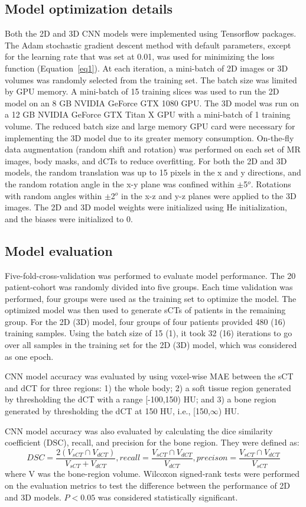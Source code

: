 \subsection{Model optimization details}  
Both the 2D and 3D CNN models were implemented using Tensorflow\cite{RN38} packages. The Adam stochastic gradient descent method\cite{RN39} with default parameters, except for the learning rate that was set at 0.01, was used for minimizing the loss function (Equation~\ref{eq1}). At each iteration, a mini-batch of 2D images or 3D volumes was randomly selected from the training set. The batch size was limited by GPU memory. A mini-batch of 15 training slices was used to run the 2D model on an 8 GB NVIDIA GeForce GTX 1080 GPU. The 3D model was run on a 12 GB NVIDIA GeForce GTX Titan X GPU with a mini-batch of 1 training volume. The reduced batch size and large memory GPU card were necessary for implementing the 3D model due to its greater memory consumption. On-the-fly data augmentation (random shift and rotation) was performed on each set of MR images, body masks, and dCTs to reduce overfitting. For both the 2D and 3D models, the random translation was up to 15 pixels in the x and y directions, and the random rotation angle in the x-y plane was confined within $\pm$5$^{o}$. Rotations with random angles within $\pm$2$^{o}$ in the x-z and y-z planes were applied to the 3D images. The 2D and 3D model weights were initialized using He initialization{\cite{RN40}}, and the biases were initialized to 0. 

\subsection{Model evaluation}  
Five-fold-cross-validation was performed to evaluate model performance. The 20 patient-cohort was randomly divided into five groups. Each time validation was performed, four groups were used as the training set to optimize the model. The optimized model was then used to generate sCTs of patients in the remaining group. For the 2D (3D) model, four groups of four patients provided 480 (16) training samples. Using the batch size of 15 (1), it took 32 (16) iterations to go over all samples in the training set for the 2D (3D) model, which was considered as one epoch. 

CNN model accuracy was evaluated by using voxel-wise MAE between the sCT and dCT for three regions: 1) the whole body; 2) a soft tissue region generated by thresholding the dCT with a range [-100,150) HU; and 3) a bone region generated by thresholding the dCT at 150 HU, i.e., [150,$\infty$) HU.

CNN model accuracy was also evaluated by calculating the dice similarity coefficient (DSC), recall, and precision for the bone region. They were defined as:
\begin{equation}
\label{eq2}
DSC = \frac{2(V_{sCT} \cap V_{dCT})}{V_{sCT} + V_{dCT}},
recall = \frac{V_{sCT} \cap V_{dCT}}{V_{dCT}},
precison = \frac{V_{sCT} \cap V_{dCT}}{V_{sCT}}
\end{equation}
where V was the bone-region volume.
Wilcoxon signed-rank tests were performed on the evaluation metrics to test the difference between the performance of 2D and 3D models. $P < 0.05$ was considered statistically significant.
